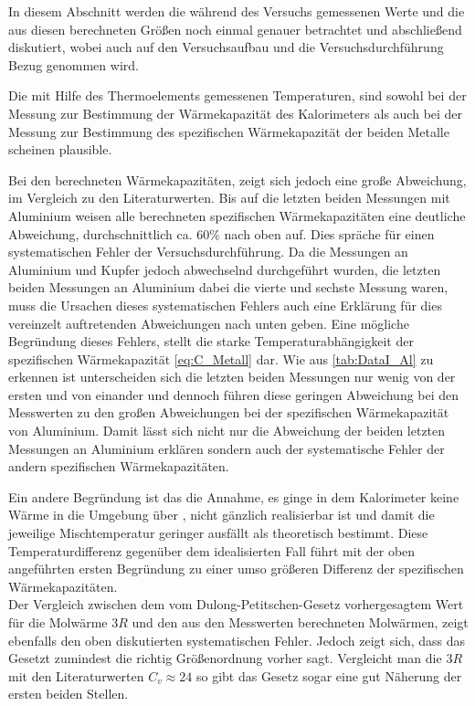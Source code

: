 In diesem Abschnitt werden die während des Versuchs gemessenen Werte und
die aus diesen berechneten Größen noch einmal genauer betrachtet und 
abschließend diskutiert, wobei auch auf den Versuchsaufbau und die
Versuchsdurchführung Bezug genommen wird.


Die mit Hilfe des Thermoelements gemessenen Temperaturen, sind sowohl bei der 
Messung zur Bestimmung der Wärmekapazität des Kalorimeters als auch bei der Messung
zur Bestimmung des spezifischen Wärmekapazität der beiden Metalle scheinen plausible.

Bei den berechneten Wärmekapazitäten, zeigt sich jedoch eine große Abweichung, im Vergleich zu den Literaturwerten. Bis auf die letzten beiden Messungen mit Aluminium weisen alle 
berechneten spezifischen Wärmekapazitäten eine deutliche Abweichung, durchschnittlich
ca. 60\% nach oben auf. Dies spräche für einen systematischen Fehler der Versuchsdurchführung.
Da die Messungen an Aluminium und Kupfer jedoch abwechselnd durchgeführt wurden, die letzten beiden Messungen an Aluminium dabei die vierte und sechste Messung waren, muss die Ursachen dieses systematischen Fehlers auch eine Erklärung für dies vereinzelt auftretenden Abweichungen nach unten geben.
Eine mögliche Begründung dieses Fehlers, stellt die starke Temperaturabhängigkeit der 
spezifischen Wärmekapazität \eqref{eq:C_Metall} dar. Wie aus \autoref{tab:DataI_Al} zu erkennen ist unterscheiden sich die letzten beiden Messungen nur wenig von der ersten und von einander und dennoch führen diese geringen Abweichung  bei 
den Messwerten zu den großen Abweichungen bei der spezifischen
Wärmekapazität von Aluminium. Damit lässt sich nicht nur die 
Abweichung der beiden letzten Messungen an Aluminium erklären sondern
auch der systematische Fehler der andern spezifischen
Wärmekapazitäten.

Ein andere Begründung ist das die Annahme, es ginge in 
dem Kalorimeter keine Wärme in die Umgebung über , nicht  
gänzlich realisierbar ist und damit die jeweilige Mischtemperatur 
geringer ausfällt als theoretisch bestimmt.
Diese Temperaturdifferenz gegenüber dem idealisierten Fall führt 
mit der oben angeführten ersten Begründung zu einer umso größeren 
Differenz der spezifischen Wärmekapazitäten.\\

Der Vergleich zwischen dem vom Dulong-Petitschen-Gesetz
vorhergesagtem Wert für die Molwärme $3R$ und den aus den 
Messwerten berechneten Molwärmen, zeigt ebenfalls den oben 
diskutierten systematischen Fehler. 
Jedoch zeigt sich, dass das Gesetzt zumindest die richtig 
Größenordnung vorher sagt. Vergleicht man die $3R$ mit den
Literaturwerten $C_{v} \approx 24$ so gibt das Gesetz sogar eine gut 
Näherung der ersten beiden Stellen.            

 
